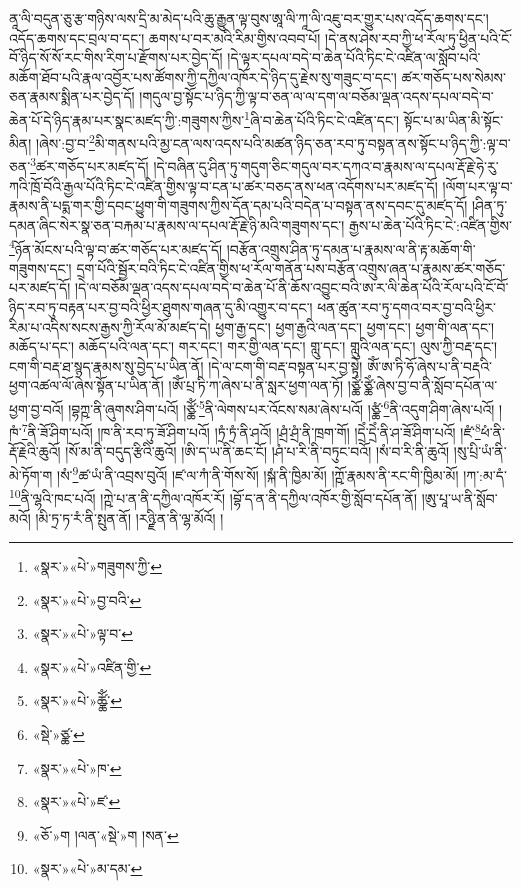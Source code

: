 ནཱ་ལི་བདུན་ཅུ་རྩ་གཉིས་ལས་དྲི་མ་མེད་པའི་ཆུ་རྒྱུན་ལྟ་བུས་ཨཱ་ལི་ཀཱ་ལི་འཇུ་བར་གྱུར་པས་འདོད་ཆགས་དང་། འདོད་ཆགས་དང་བྲལ་བ་དང་། ཆགས་པ་བར་མའི་རིམ་གྱིས་འབབ་པོ། །དེ་ནས་ཤེས་རབ་ཀྱི་ཕ་རོལ་ཏུ་ཕྱིན་པའི་ངོ་བོ་ཉིད་སོ་སོ་རང་གིས་རིག་པ་རྫོགས་པར་བྱེད་དོ། །དེ་ལྟར་དཔལ་བདེ་བ་ཆེན་པོའི་ཏིང་ངེ་འཛིན་ལ་སློབ་པའི་མཆོག་ཐོབ་པའི་རྣལ་འབྱོར་པས་ཚོགས་ཀྱི་དཀྱིལ་འཁོར་དེ་ཉིད་དུ་རྗེས་སུ་གཟུང་བ་དང་། ཚར་གཅོད་པས་སེམས་ཅན་རྣམས་སྨིན་པར་བྱེད་དོ། །གདུལ་བྱ་སྟོང་པ་ཉིད་ཀྱི་ལྟ་བ་ཅན་ལ་ལ་དག་ལ་བཅོམ་ལྡན་འདས་དཔལ་བདེ་བ་ཆེན་པོ་དེ་ཉིད་རྣམ་པར་སྣང་མཛད་ཀྱི་:གཟུགས་ཀྱིས་\footnote{«སྣར་»«པེ་»གཟུགས་ཀྱི་}ཞི་བ་ཆེན་པོའི་ཏིང་ངེ་འཛིན་དང་། སྟོང་པ་མ་ཡིན་མི་སྟོང་མིན། །ཞེས་:བྱ་བ་\footnote{«སྣར་»«པེ་»བྱ་བའི་}མི་གནས་པའི་མྱ་ངན་ལས་འདས་པའི་མཚན་ཉིད་ཅན་རབ་ཏུ་བསྟན་ནས་སྟོང་པ་ཉིད་ཀྱི་:ལྟ་བ་ཅན་\footnote{«སྣར་»«པེ་»ལྟ་བ་}ཚར་གཅོད་པར་མཛད་དོ། །དེ་བཞིན་དུ་ཤིན་ཏུ་གདུག་ཅིང་གདུལ་བར་དཀའ་བ་རྣམས་ལ་དཔལ་རྡོ་རྗེ་ཧེ་རུ་ཀའི་ཁྲོ་བོའི་རྒྱལ་པོའི་ཏིང་ངེ་འཛིན་གྱིས་ལྟ་བ་ངན་པ་ཚར་བཅད་ནས་ཕན་འདོགས་པར་མཛད་དོ། །ལོག་པར་ལྟ་བ་རྣམས་ནི་པདྨ་གར་གྱི་དབང་ཕྱུག་གི་གཟུགས་ཀྱིས་དོན་དམ་པའི་བདེན་པ་བསྟན་ནས་དབང་དུ་མཛད་དོ། །ཤིན་ཏུ་དམན་ཞིང་སེར་སྣ་ཅན་བརྐམ་པ་རྣམས་ལ་དཔལ་རྡོ་རྗེ་ཉི་མའི་གཟུགས་དང་། རྒྱས་པ་ཆེན་པོའི་ཏིང་ངེ་:འཛིན་གྱིས་\footnote{«སྣར་»«པེ་»འཛིན་གྱི་}ཉོན་མོངས་པའི་ལྟ་བ་ཚར་གཅོད་པར་མཛད་དོ། །བརྩོན་འགྲུས་ཤིན་ཏུ་དམན་པ་རྣམས་ལ་ནི་རྟ་མཆོག་གི་གཟུགས་དང་། དྲག་པོའི་སྦྱོར་བའི་ཏིང་ངེ་འཛིན་གྱིས་ཕ་རོལ་གནོན་པས་བརྩོན་འགྲུས་ཞན་པ་རྣམས་ཚར་གཅོད་པར་མཛད་དོ། །དེ་ལ་བཅོམ་ལྡན་འདས་དཔལ་བདེ་བ་ཆེན་པོ་ནི་ཆོས་འབྱུང་བའི་ཨ་ར་ལི་ཆེན་པོའི་རོལ་པའི་ངོ་བོ་ཉིད་རབ་ཏུ་བརྟན་པར་བྱ་བའི་ཕྱིར་ཐུགས་གཞན་དུ་མི་འགྱུར་བ་དང་། ཕན་ཚུན་རབ་ཏུ་དགའ་བར་བྱ་བའི་ཕྱིར་རིམ་པ་འདིས་སངས་རྒྱས་ཀྱི་རོལ་མོ་མཛད་དེ། ཕྱག་རྒྱ་དང་། ཕྱག་རྒྱའི་ལན་དང་། ཕྱག་དང་། ཕྱག་གི་ལན་དང་། མཆོད་པ་དང་། མཆོད་པའི་ལན་དང་། གར་དང་། གར་གྱི་ལན་དང་། གླུ་དང་། གླུའི་ལན་དང་། ལུས་ཀྱི་བརྡ་དང་། ངག་གི་བརྡ་ཐ་སྙད་རྣམས་སུ་བྱེད་པ་ཡིན་ནོ། །དེ་ལ་ངག་གི་བརྡ་བསྟན་པར་བྱ་སྟེ། ཨོཾ་ཨ་ཏི་ཧོ་ཞེས་པ་ནི་བརྡའི་ཕྱག་འཚལ་ལོ་ཞེས་སྟོན་པ་ཡིན་ནོ། །ཨོཾ་པྲ་ཏི་ཀ་ཞེས་པ་ནི་སླར་ཕྱག་ལན་ཏོ། །ཙྪེཾ་ཙྪེཾ་ཞེས་བྱ་བ་ནི་སློབ་དཔོན་ལ་ཕྱག་བྱ་བའོ། །བྷཀྵ་ནི་ཞུགས་ཤིག་པའོ། །ཙྪོཾ་\footnote{«སྣར་»«པེ་»ཚྪོཾ་}ནི་ལེགས་པར་འོངས་སམ་ཞེས་པའོ། །ཙྪཾ་\footnote{«སྡེ་»ཙྪ་}ནི་འདུག་ཤིག་ཞེས་པའོ། །ཁཾ་\footnote{«སྣར་»«པེ་»ཁ་}ནི་ཟོ་ཤིག་པའོ། །ཁ་ནི་རབ་ཏུ་ཟོ་ཤིག་པའོ། །ཏྲཾ་ཏྲཾ་ནི་ཤའོ། །ཤྲཾ་ཤྲཾ་ནི་ཁྲག་གོ། །དྲེཾ་དྲེཾ་ནི་ཤ་ཟོ་ཤིག་པའོ། །ཛཾ་\footnote{«སྣར་»«པེ་»ཛ་}ཕཾ་ནི་རྡོ་རྗེའི་ཆུའོ། །སོ་མ་ནི་བདུད་རྩིའི་ཆུའོ། །ཨི་ད་ཡ་ནི་ཆང་ངོ། །ཤཾ་པ་རི་ནི་བཏུང་བའོ། །སཾ་བ་རི་ནི་ཆུའོ། །སུ་པྲི་ཡཾ་ནི་མེ་ཏོག་ག །སཾ་\footnote{«ཅོ་»ག །ལན་«སྡེ་»ག །སན་}ཚ་ཡཾ་ནི་འབྲས་བུའོ། །ཛ་ལ་ཀཾ་ནི་གོས་སོ། །སྐཾ་ནི་ཁྱིམ་མོ། །ཀྵོ་རྣམས་ནི་རང་གི་ཁྱིམ་མོ། །ཀ་:མ་དཾ་\footnote{«སྣར་»«པེ་»མ་དམ་}ནི་ལྷའི་ཁང་པའོ། །ཀྵེ་པ་ན་ནི་དཀྱིལ་འཁོར་རོ། །བྷོ་ད་ན་ནི་དཀྱིལ་འཁོར་གྱི་སློབ་དཔོན་ནོ། །ཨུ་པཱ་ཡ་ནི་སློབ་མའོ། །མི་ཏྲ་ཏ་རཾ་ནི་སྤུན་ནོ། །རཉྫི་ན་ནི་ལྷ་མོའོ། །
